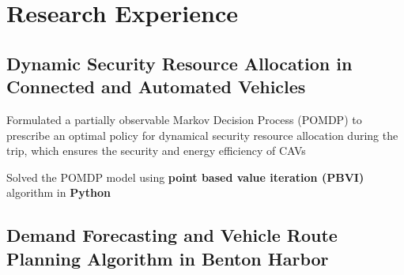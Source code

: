 \documentclass[]{Keval-resume}
\begin{document}

\section{Research Experience}
\hrulefill
\postsectionsep 

\subsection{Dynamic Security Resource Allocation in Connected and Automated Vehicles
\hfill
\normalfont
}

\begin{cvitems}
    \item
        {Formulated a partially observable Markov Decision Process (POMDP) to prescribe an optimal policy for dynamical security resource allocation during the trip, which ensures the security and energy efficiency of CAVs}
    \item
        {Solved the POMDP model using \textbf{point based value iteration (PBVI)} algorithm in \textbf{Python}}
\end{cvitems}
\sectionsep

\subsection{Demand Forecasting and Vehicle Route Planning Algorithm in Benton Harbor
\hfill 
\normalfont 
}
\end{document}
